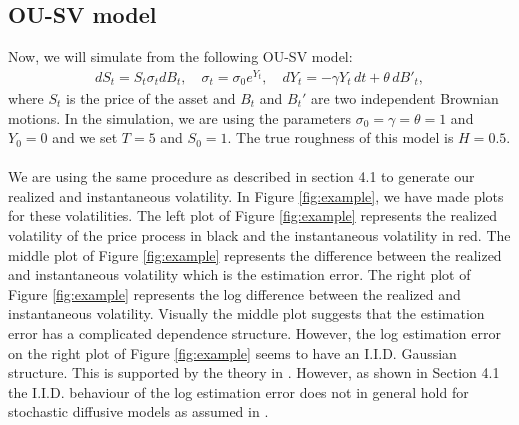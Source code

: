 \documentclass{article}
\begin{document}
\subsection{OU-SV model}
Now, we will simulate from the following OU-SV model:
\begin{align}
dS_t = S_t \sigma_t dB_t, \quad \sigma_t = \sigma_0 e^{Y_t}, \quad dY_t = -\gamma Y_t \, dt + \theta \, dB'_t, \label{eq:ousv}
\end{align}
where $S_t$ is the price of the asset and $B_t$ and $B_t'$ are two independent Brownian motions. In the simulation, we are using the parameters $\sigma_0=\gamma=\theta=1$ and $Y_0=0$ and we set $T=5$ and $S_0=1$. The true roughness of this model is $H=0.5$.\\\\
We are using the same procedure as described in section 4.1 to generate our realized and instantaneous volatility. In Figure \ref{fig:example}, we have made plots for these volatilities. The left plot of Figure \ref{fig:example} represents the realized volatility of the price process in black and the instantaneous volatility in red. The middle plot of Figure \ref{fig:example} represents the difference between the realized and instantaneous volatility which is the estimation error. The right plot of Figure \ref{fig:example} represents the log difference between the realized and instantaneous volatility. Visually the middle plot suggests that the estimation error has a complicated dependence structure. However, the log estimation error on the right plot of Figure \ref{fig:example} seems to have an I.I.D. Gaussian structure. This is supported by the theory in \cite{fukasawa}. However, as shown in Section 4.1 the I.I.D. behaviour of the log estimation error does not in general hold for stochastic diffusive models as assumed in \cite{fukasawa}. 
\end{document}
